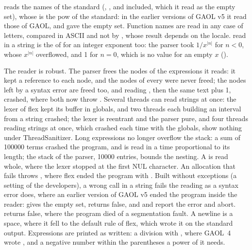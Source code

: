  reads the names of the standard
(, ,  and
 included, which it read as the empty set), whose 
is the pow of the standard: in the earlier versions of GAOL v5
it read those of GAOL, and  gave the empty set. Function names are read in any case of
letters, compared in ASCII and not by , whose result
depends on the locale.  read in a string is the 
of  for an integer exponent too: the parser took $1/x^{|n|}$ for
$n < 0$, whose $x^{|n|}$ overflowed, and 1 for $n = 0$, which is no value for
an empty $x$ ().

\medskip
The reader is robust.\newinvfive{} The parser frees the nodes of the
expressions it reads: it kept a reference to each node, and the nodes of
every  were never freed; the nodes left by a syntax
error are freed too, and reading , then the same
text plus 1, crashed, where both now throw .
Several threads can read strings at once: the lexer of flex kept its buffer
in globals, and two threads each building an interval from a string crashed;
the lexer is reentrant and the parser pure, and four threads reading strings
at once, which crashed each time with the globals, show nothing under
ThreadSanitizer. Long expressions no longer overflow the stack: a sum of
100000 terms crashed the program, and is read in a time proportional to its
length; the stack of the parser, 10000 entries, bounds the nesting. A
 is read whole, where the lexer stopped at the first NUL
character. An allocation that fails throws , where
flex ended the program with . Built without exceptions (a setting of the developers), a
wrong call in a string fails the reading as a syntax error does, where an
earlier version of GAOL v5 ended the program inside the reader:
 gives the empty set,
 returns false, and  and
 report the error and abort.  returns false, where the program
died of a segmentation fault. A newline is a space, where it fell to the
default rule of flex, which wrote it on the standard output. Expressions are
printed as written: a division with \code{/}, where GAOL~4 wrote \code{*},
and a negative number within the parentheses a power of it needs.

